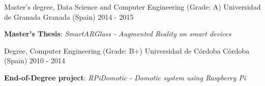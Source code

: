 

\begin{cventries}

  \cventry
    {Master's degree, Data Science and Computer Engineering (Grade: A)} %
    {Universidad de Granada} %
    {Granada (Spain)} %
    {2014 - 2015} %
    {
      \begin{cvitems} %
        \item {\textbf{Master's Thesis}: \textit{SmartARGlass - Augmented Reality on smart devices}}
      \end{cvitems}
    }
    
  \cventry
    {Degree, Computer Engineering (Grade: B+)} %
    {Universidad de Córdoba} %
    {Córdoba (Spain)} %
    {2010 - 2014} %
    {
      \begin{cvitems} %
        \item {\textbf{End-of-Degree project}: \textit{RPiDomotic - Domotic system using Raspberry Pi}}
      \end{cvitems}
    }

\end{cventries}
